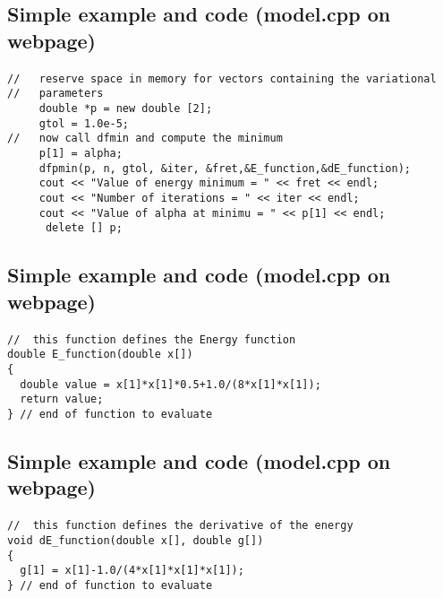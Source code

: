 \documentclass[%
twoside,                 %
final,                   %
10pt]{article}
\begin{document}
\subsection*{Simple example and code (model.cpp on webpage)}

\paragraph{}
\begin{verbatim}
//   reserve space in memory for vectors containing the variational
//   parameters
     double *p = new double [2];
     gtol = 1.0e-5;
//   now call dfmin and compute the minimum
     p[1] = alpha;
     dfpmin(p, n, gtol, &iter, &fret,&E_function,&dE_function);
     cout << "Value of energy minimum = " << fret << endl;
     cout << "Number of iterations = " << iter << endl;
     cout << "Value of alpha at minimu = " << p[1] << endl;
      delete [] p;
\end{verbatim}




\subsection*{Simple example and code (model.cpp on webpage)}

\paragraph{}
\begin{verbatim}
//  this function defines the Energy function
double E_function(double x[])
{
  double value = x[1]*x[1]*0.5+1.0/(8*x[1]*x[1]);
  return value;
} // end of function to evaluate
\end{verbatim}



\subsection*{Simple example and code (model.cpp on webpage)}

\paragraph{}
\begin{verbatim}
//  this function defines the derivative of the energy 
void dE_function(double x[], double g[])
{
  g[1] = x[1]-1.0/(4*x[1]*x[1]*x[1]);
} // end of function to evaluate
\end{verbatim}
\end{document}
